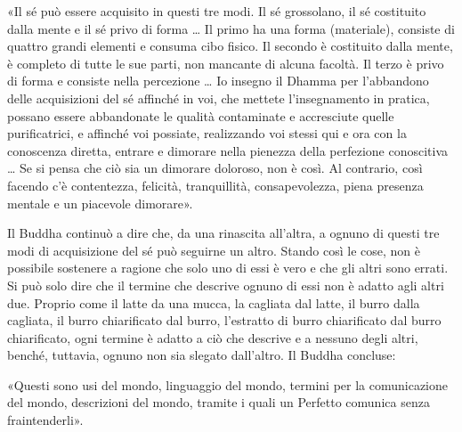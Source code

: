 

«Il sé può essere acquisito in questi tre modi. Il sé grossolano, il sé
costituito dalla mente e il sé privo di forma … Il primo ha una forma
(materiale), consiste di quattro grandi elementi e consuma cibo fisico.
Il secondo è costituito dalla mente, è completo di tutte le sue parti,
non mancante di alcuna facoltà. Il terzo è privo di forma e consiste
nella percezione … Io insegno il Dhamma per l’abbandono delle
acquisizioni del sé affinché in voi, che mettete l’insegnamento in
pratica, possano essere abbandonate le qualità contaminate e accresciute
quelle purificatrici, e affinché voi possiate, realizzando voi stessi
qui e ora con la conoscenza diretta, entrare e dimorare nella pienezza
della perfezione conoscitiva … Se si pensa che ciò sia un dimorare
doloroso, non è così. Al contrario, così facendo c’è contentezza,
felicità, tranquillità, consapevolezza, piena presenza mentale e un
piacevole dimorare».


 Il Buddha continuò a dire che, da una rinascita
all’altra, a ognuno di questi tre modi di acquisizione del sé può
seguirne un altro. Stando così le cose, non è possibile sostenere a
ragione che solo uno di essi è vero e che gli altri sono errati. Si può
solo dire che il termine che descrive ognuno di essi non è adatto agli
altri due. Proprio come il latte da una mucca, la cagliata dal latte, il
burro dalla cagliata, il burro chiarificato dal burro, l’estratto di
burro chiarificato dal burro chiarificato, ogni termine è adatto a ciò
che descrive e a nessuno degli altri, benché, tuttavia, ognuno non sia
slegato dall’altro. Il Buddha concluse:


 «Questi sono usi del mondo, linguaggio del mondo, termini
per la comunicazione del mondo, descrizioni del mondo, tramite i quali
un Perfetto comunica senza fraintenderli».




